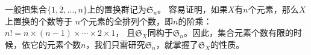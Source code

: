\documentclass[12pt,UTF8,fontset=none]{ctexbook}
\begin{document}
一般把集合$\{1,2,\ldots, n\}$上的置换群记为$\mathfrak{S}_n$。
容易证明，如果$X$有$n$个元素，那么$X$上置换的个数等于
$n$个元素的全排列个数，即$n$的阶乘：$n! = n\times (n-1)\times \cdots\times 2 \times  1$，
且$\mathfrak{S}_X$同构于$\mathfrak{S}_n$。因此，集合元素个数有限的时候，依它的元素个数$n$，我们只需研究$\mathfrak{S}_n$，就掌握了$\mathfrak{S}_X$的性质。

\end{document}
